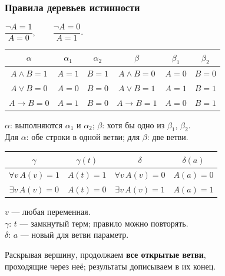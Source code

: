 \documentclass[10pt]{beamer}
\begin{document}
\begin{frame}
\frametitle{Правила деревьев истинности}
\small
\setlength{\parskip}{0pt}
\begin{center}
    \vspace*{0.5em}
    $\dfrac{\neg A=1}{A=0},\qquad \dfrac{\neg A=0}{A=1}$.

    \medskip
    \begin{tabular}{|c|c|c||c|c|c|}
        \hline
        $\alpha$ & $\alpha_1$ & $\alpha_2$ & $\beta$ & $\beta_1$ & $\beta_2$ \\
        \hline
        $A\land B=1$ & $A=1$ & $B=1$ & $A\land B=0$ & $A=0$ & $B=0$ \\
        $A\lor B=0$ & $A=0$ & $B=0$ & $A\lor B=1$ & $A=1$ & $B=1$ \\
        $A\to B=0$ & $A=1$ & $B=0$ & $A\to B=1$ & $A=0$ & $B=1$ \\
        \hline
    \end{tabular}

    \smallskip
    $\alpha$: выполняются $\alpha_1$ и $\alpha_2$; $\beta$: хотя бы одно из $\beta_1$, $\beta_2$.\\
    Для $\alpha$: обе строки в одной ветви; для $\beta$: две ветви.
    \pause

    \medskip
    \begin{tabular}{|c|c||c|c|}
        \hline
        $\gamma$ & $\gamma(t)$ & $\delta$ & $\delta(a)$ \\
        \hline
        $\forall v\,A(v)=1$ & $A(t)=1$ & $\forall v\,A(v)=0$ & $A(a)=0$ \\
        $\exists v\,A(v)=0$ & $A(t)=0$ & $\exists v\,A(v)=1$ & $A(a)=1$ \\
        \hline
    \end{tabular}

    \smallskip
    $v$ --- любая переменная.\\
    $\gamma$: $t$ --- замкнутый терм; правило можно повторять.\\
    $\delta$: $a$ --- новый для ветви параметр.

    \smallskip
    Раскрывая вершину, продолжаем \textbf{все открытые ветви},\\
    проходящие через неё; результаты дописываем в их конец.
\end{center}
\end{frame}
\end{document}
